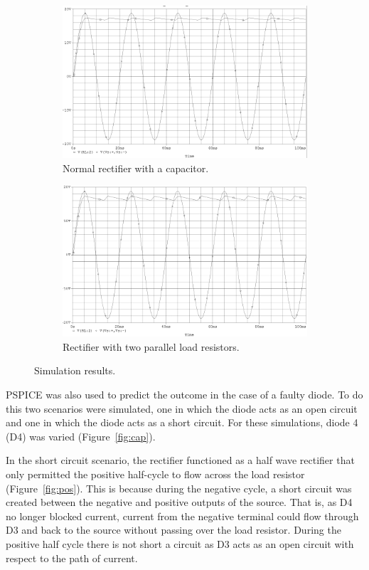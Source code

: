 \documentclass[12pt]{article}
\begin{document}
\begin{figure}[h!]
\centering
\begin{subfigure}[b]{0.7\textwidth}
\includegraphics[width=\textwidth]{out_norm}
\caption{Normal rectifier with a capacitor.}
\label{fig:norm}
\end{subfigure}
\qquad
\begin{subfigure}[b]{0.7\textwidth}
\includegraphics[width=\textwidth]{out_res}
\caption{Rectifier with two parallel load resistors.}
\label{fig:res}
\end{subfigure}
\caption{Simulation results.}
\label{fig:sim}
\end{figure}

PSPICE was also used to predict the outcome in the case of a faulty diode. To do this two scenarios were simulated, one in which the diode acts as an open circuit and one in which the diode acts as a short circuit. For these simulations, diode 4 (D4) was varied (Figure~\ref{fig:cap}).

In the short circuit scenario, the rectifier functioned as a half wave rectifier that only permitted the positive half-cycle to flow across the load resistor (Figure~\ref{fig:pos}). This is because during the negative cycle, a short circuit was created between the negative and positive outputs of the source. That is, as D4 no longer blocked current, current from the negative terminal could flow through D3 and back to the source without passing over the load resistor. During the positive half cycle there is not short a circuit as D3 acts as an open circuit with respect to the path of current.
\end{document}

